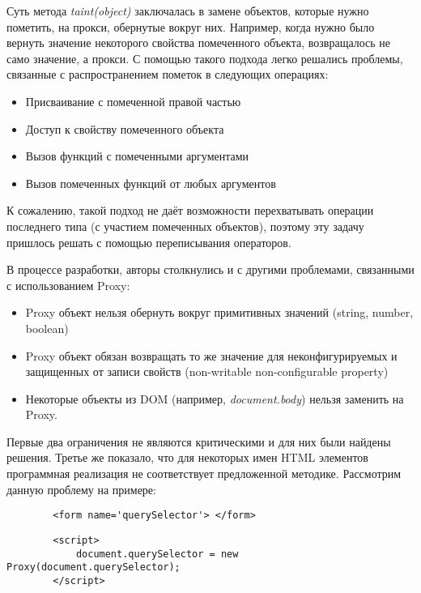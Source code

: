 	Суть метода \textit{taint(object)} заключалась в замене объектов, которые нужно пометить, на прокси, обернутые вокруг них. Например, когда нужно было вернуть значение некоторого свойства помеченного объекта, возвращалось не само значение, а прокси. С помощью такого подхода легко решались проблемы, связанные с распространением пометок в следующих операциях:
	

	\begin{itemize}
		\item Присваивание с помеченной правой частью
		\item Доступ к свойству помеченного объекта
		\item Вызов функций с помеченными аргументами
		\item Вызов помеченных функций от любых аргументов
	\end{itemize}


	К сожалению, такой подход не даёт возможности перехватывать операции последнего типа (с участием помеченных объектов), поэтому эту задачу пришлось решать с помощью переписывания операторов.


	В процессе разработки, авторы столкнулись и с другими проблемами, связанными с использованием Proxy:


	\begin{itemize}
		\item Proxy объект нельзя обернуть вокруг примитивных значений (string, number, boolean)
		\item Proxy объект обязан возвращать то же значение для неконфигурируемых и защищенных от записи свойств (non-writable non-configurable property)
		\item Некоторые объекты из DOM (например, \textit{document.body}) нельзя заменить на Proxy.
	\end{itemize}


	Первые два ограничения не являются критическими и для них были найдены решения. Третье же показало, что для некоторых имен HTML элементов программная реализация не соответствует предложенной методике. Рассмотрим данную проблему на примере:

	\begin{lstlisting}
		<form name='querySelector'> </form>
	\end{lstlisting}

	\begin{lstlisting}
		<script>
			document.querySelector = new Proxy(document.querySelector);
		</script>
	\end{lstlisting}

